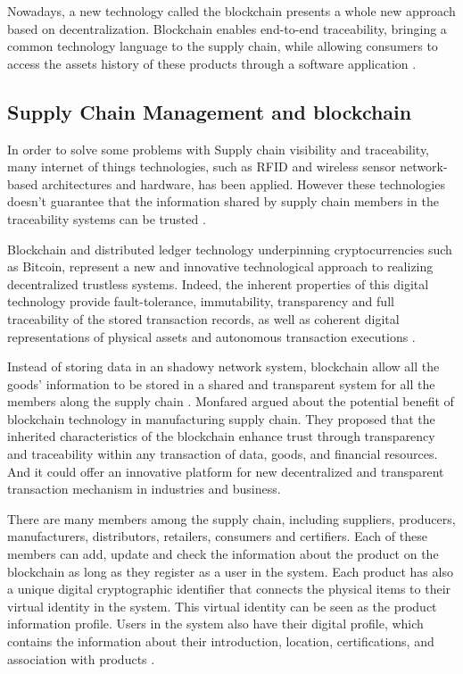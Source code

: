 Nowadays, a new technology called the blockchain presents a whole new approach based on decentralization. Blockchain enables end-to-end traceability, bringing a common technology language to the supply chain, while allowing consumers to access the assets history of these products through a software application \cite{galvez2018future}.


\subsection{Supply Chain Management and blockchain}\label{sec:scm}

In order to solve some problems with Supply chain visibility and traceability, many internet of things technologies, such as RFID and wireless sensor network-based architectures and hardware, has been applied. However these technologies doesn't guarantee that the information shared by supply chain members in the traceability systems can be trusted \cite{tian2017supply}.

Blockchain and distributed ledger technology underpinning cryptocurrencies such as Bitcoin, represent a new and innovative technological approach to realizing decentralized trustless systems. Indeed, the inherent properties of this digital technology provide fault-tolerance, immutability, transparency and full traceability of the stored transaction records, as well as coherent digital representations of physical assets and autonomous transaction executions \cite{caro2018blockchain}.

Instead of storing data in an shadowy network system, blockchain allow all the goods' information to be stored in a shared and transparent system for all the members along the supply chain \cite{tian2017supply}. Monfared \cite{abeyratne2016blockchain} argued about the potential benefit of blockchain technology in manufacturing supply chain. They proposed that the inherited characteristics of the blockchain enhance trust through transparency and traceability within any transaction of data, goods, and financial resources. And it could offer an innovative platform for new decentralized and transparent transaction mechanism in industries and business.

There are many members among the supply chain, including suppliers, producers, manufacturers, distributors, retailers, consumers and certifiers. Each of these members can add, update and check the information about the product on the blockchain as long as they register as a user in the system. Each product has also a unique digital cryptographic identifier that connects the physical items to their virtual identity in the system. This virtual identity can be seen as the product information profile. Users in the system also have their digital profile, which contains the information about their introduction, location, certifications, and association with products \cite{tian2017supply}.

